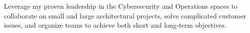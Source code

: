 

\begin{cvparagraph}

Leverage my proven leadership in the Cybersecurity and Operations spaces to collaborate on small and large architectural projects, solve complicated customer issues, and organize teams to achieve both short and long-term objectives. 
\end{cvparagraph}
